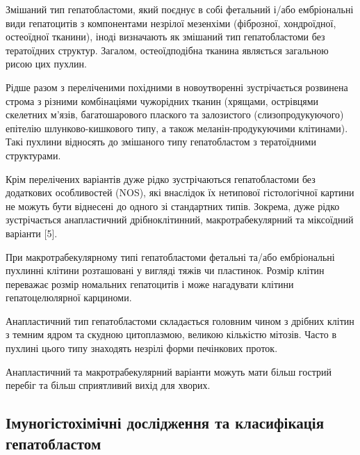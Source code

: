 Змішаний тип гепатобластоми, який  поєднує в собі фетальний  і/або ембріональні види гепатоцитів з компонентами незрілої мезенхіми    (фіброзної, хондроїдної, остеоїдної тканини), іноді визначають як змішаний тип гепатобластоми без тератоїдних структур. Загалом, остеоїдподібна тканина являється загальною рисою цих пухлин.

Рідше разом з переліченими похідними в новоутворенні зустрічається розвинена строма з різними комбінаціями  чужорідних  тканин (хрящами, острівцями скелетних м’язів, багатошарового плаского та залозистого (слизопродукуючого) епітелію шлунково-кишкового типу, а також меланін-продукуючими клітинами). Такі пухлини відносять до змішаного типу гепатобластом з тератоїдними структурами.

Крім перелічених варіантів дуже рідко зустрічаються гепатобластоми без додаткових особливостей (NOS), які внаслідок їх нетипової гістологічної картини не можуть бути віднесені до одного зі стандартних типів. Зокрема, дуже рідко зустрічається анапластичний дрібноклітинний, макротрабекулярний та міксоїдний варіанти [5]. 

При макротрабекулярному типі гепатобластоми   фетальні та/або ембріональні пухлинні клітини розташовані у вигляді тяжів чи пластинок. Розмір клітин переважає розмір номальних гепатоцитів і може нагадувати клітини гепатоцелюлярної карциноми.

Анапластичний тип гепатобластоми складається головним чином з дрібних клітин з темним ядром та скудною цитоплазмою, великою кількістю мітозів. Часто в пухлині цього типу знаходять незрілі форми печінкових проток.

Анапластичний та макротрабекулярний варіанти можуть мати більш гострий перебіг та більш сприятливий вихід для хворих.

\subsection{Імуногістохімічні дослідження та класифікація гепатобластом}

